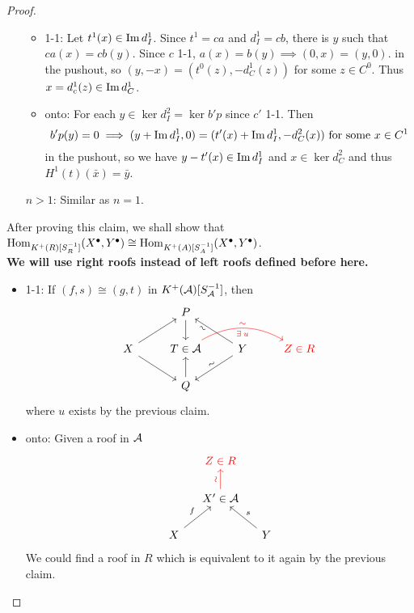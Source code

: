 \begin{theorem}
\begin{proof}
\begin{enumerate}
      \begin{itemize}
        \item 1-1: Let $t^1(x) \in \operatorname{Im} d^1_I$. Since $t^1 = ca$
          and $d^1_I = cb$, there is $y$ such that
          $ca(x) = cb(y)$. Since $c$ 1-1, $a(x) = b(y) \implies (0, x) = (y, 0)$.
          in the pushout, so $(y, -x) = (t^0(z), -d^1_C(z))$ for some $z \in C^0$.
          Thus $x = d^1_c(z) \in \operatorname{Im} d^1_C$.
        \item onto: For each $y \in \ker d_I^2 = \ker b'p$ since $c'$ 1-1.
          Then
          \[ b'p(y) = 0 \implies (y + \operatorname{Im} d^1_I, 0) = (t'(x) + \operatorname{Im} d^1_I, -d^2_C(x))
            \text{ for some } x \in C^1 \]
          in the pushout, so we have $y - t'(x) \in \operatorname{Im} d^1_I$ and
          $ x \in \ker d^2_C$ and thus $H^1(t)(\bar{x}) = \bar{y}$.
      \end{itemize}
    \item[$n > 1$:] Similar as $n = 1$.
    \end{enumerate}
    \medskip

    After proving this claim, we shall show that
    $\operatorname{Hom}_{K^+(R)[S_R^{-1}]}(X^\bullet, Y^\bullet)
    \cong \operatorname{Hom}_{K^+(A)[S^{-1}_A]}(X^\bullet, Y^\bullet)$. \\
    {\bf We will use right roofs instead of left roofs defined before here.}
    \begin{itemize}
      \item 1-1: If $(f, s) \cong (g, t)$ in $K^+(\mathcal{A})[S^{-1}_{\mathcal{A}}]$, then
        \[ \begin{tikzcd}
            & P \ar[d] & & \\
          X \ar[ru] \ar[rd] & T \in \Ac \ar[rr, bend left, "\sim", "\exists u"', sloped, red] &
          Y \ar[lu, "\sim"', sloped, near end] \ar[ld, "\sim", sloped] & {\color{red} Z \in R} \\
          & Q \ar[u] & &
        \end{tikzcd} \]
      where $u$ exists by the previous claim.
      \item onto: Given a roof in $\mathcal{A}$
        \[ \begin{tikzcd}[column sep=small]
            & {\color{red} Z \in R} & \\
            & X' \in \Ac \ar[u, "\rotatebox{90}{\(\sim\)}", red] & \\
            X \ar[ru, "f"] & & Y \ar[lu, "s"']
        \end{tikzcd} \]
      We could find a roof in $R$ which is equivalent to it again
      by the previous claim.
    \end{itemize}
  \end{proof}
\end{theorem}


